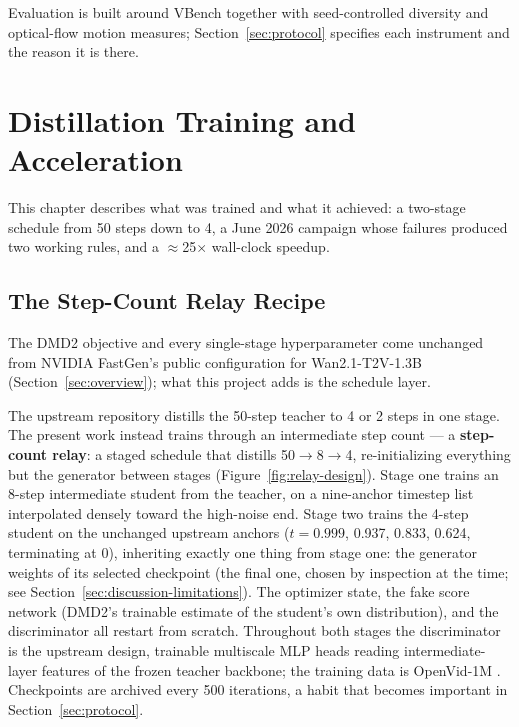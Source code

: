 \documentclass[11pt,a4paper]{article}
\begin{document}
Evaluation is built around VBench \cite{vbench} together with seed-controlled diversity and optical-flow motion measures; Section~\ref{sec:protocol} specifies each instrument and the reason it is there.

\section{Distillation Training and Acceleration}\label{sec:training}

This chapter describes what was trained and what it achieved: a two-stage schedule from 50 steps down to 4, a June 2026 campaign whose failures produced two working rules, and a $\approx$25$\times$ wall-clock speedup.

\subsection{The Step-Count Relay Recipe}\label{sec:training-recipe}

The DMD2 objective \cite{dmd1,dmd2} and every single-stage hyperparameter come unchanged from NVIDIA FastGen's public configuration for Wan2.1-T2V-1.3B \cite{fastgen,wan21} (Section~\ref{sec:overview}); what this project adds is the schedule layer.

The upstream repository distills the 50-step teacher to 4 or 2 steps in one stage. The present work instead trains through an intermediate step count — a \textbf{step-count relay}: a staged schedule that distills 50$\to$8$\to$4, re-initializing everything but the generator between stages (Figure~\ref{fig:relay-design}). Stage one trains an 8-step intermediate student from the teacher, on a nine-anchor timestep list interpolated densely toward the high-noise end. Stage two trains the 4-step student on the unchanged upstream anchors ($t = 0.999$, 0.937, 0.833, 0.624, terminating at 0), inheriting exactly one thing from stage one: the generator weights of its selected checkpoint (the final one, chosen by inspection at the time; see Section~\ref{sec:discussion-limitations}). The optimizer state, the fake score network (DMD2's trainable estimate of the student's own distribution), and the discriminator all restart from scratch. Throughout both stages the discriminator is the upstream design, trainable multiscale MLP heads reading intermediate-layer features of the frozen teacher backbone; the training data is OpenVid-1M \cite{openvid}. Checkpoints are archived every 500 iterations, a habit that becomes important in Section~\ref{sec:protocol}.
\end{document}
